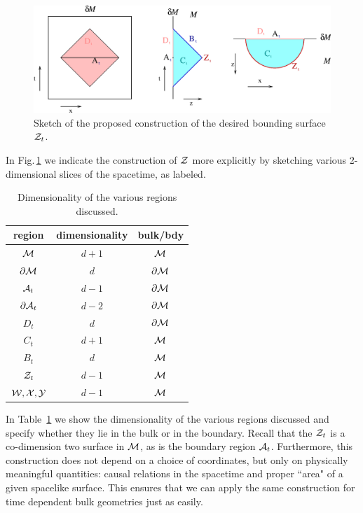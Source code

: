 \documentclass[12pt]{article}
\def\fig#1{Fig.\,\ref{#1}}
\def\p{\partial}
\def\CA{{\cal A}}
\def\CW{{\cal W}}
\def\CX{{\cal X}}
\def\CY{{\cal Y}}
\def\CZ{{\cal Z}}
\def\p{\partial}
\def\p{\partial}
\def\bulk{{\cal M}}
\def\bdy{\p{\cal M}}
\def\Gms{\CW}
\def\Lms{\CY}
\def\Xms{\CX}
\def\Cms{\CZ}
\def\rA{\CA}
\def\brA{\p \CA}
\begin{document}
\begin{figure}[htbp]
\begin{center}
\includegraphics[width=6in]{entfig}
\caption{Sketch of the proposed construction of the desired bounding
surface $\Cms_t$.} \label{EntConstrFig}
\end{center}
\end{figure}
%
In \fig{EntConstrFig} we indicate the construction of $\Cms$
more explicitly by sketching various 2-dimensional slices of the spacetime, as labeled.
\begin{table}[htp]
\caption{Dimensionality of the various regions discussed.}
\begin{center}
\begin{tabular}{|c|c|c|}
\hline
region & dimensionality & bulk/bdy \\
\hline
$\bulk$  & $d+1$ & $\bulk$ \\
$\bdy$ & $d$ & $\bdy$ \\
$\rA_t$ & $d-1$ & $\bdy$ \\
$\brA_t$ & $d-2$ & $\bdy$ \\
$D_t$ & $d$ & $\bdy$ \\
$C_t$ & $d+1$ & $\bulk$ \\
$B_t$ & $d$ & $\bulk$ \\
$\Cms_t$ & $d-1$ & $\bulk$ \\
$\Gms, \Xms, \Lms$ & $d-1$ & $\bulk$ \\
\hline
\end{tabular}
\end{center}
\label{dimensionality}
\end{table}%
In Table~\ref{dimensionality} we show the dimensionality
 of the various regions discussed and specify whether they
  lie in the bulk or in the boundary.  Recall that the
  $\Cms_t$ is a co-dimension two surface in $\bulk$, as is the
   boundary region $\rA_t$.
Furthermore, this construction does not depend on a choice
of coordinates, but only on physically meaningful quantities:
causal relations in the spacetime and proper ``area" of a given
 spacelike surface.  This ensures that we can apply the same
 construction for time dependent bulk geometries just as easily.
\end{document}
